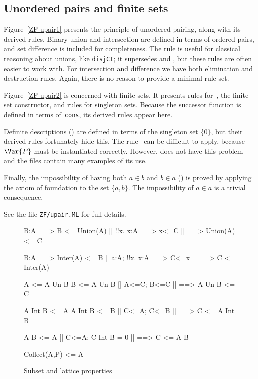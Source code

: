 \subsection{Unordered pairs and finite sets}
Figure~\ref{ZF-upair1} presents the principle of unordered pairing, along
with its derived rules.  Binary union and intersection are defined in terms
of ordered pairs, and set difference is included for completeness.  The
rule  is useful for classical reasoning about unions,
like {\tt disjCI}\@; it supersedes  and
, but these rules are often easier to work with.  For
intersection and difference we have both elimination and destruction rules.
Again, there is no reason to provide a minimal rule set.

Figure~\ref{ZF-upair2} is concerned with finite sets.  It presents rules
for~, the finite set constructor, and rules for singleton
sets.  Because the successor function is defined in terms of~{\tt cons},
its derived rules appear here.

Definite descriptions () are defined in terms of the singleton
set $\{0\}$, but their derived rules fortunately hide this.  The
rule~ can be difficult to apply, because $\Var{P}$ must be
instantiated correctly.  However,  does not have this
problem and the files contain many examples of its use.

Finally, the impossibility of having both $a\in b$ and $b\in a$
() is proved by applying the axiom of foundation to
the set $\{a,b\}$.  The impossibility of $a\in a$ is a trivial consequence.

See the file {\tt ZF/upair.ML} for full details.



\begin{figure}
\begin{ttbox}
       B:A ==> B <= Union(A)
       [| !!x. x:A ==> x<=C |] ==> Union(A) <= C

       B:A ==> Inter(A) <= B
    [| a:A;  !!x. x:A ==> C<=x |] ==> C <= Inter(A)

         A <= A Un B
         B <= A Un B
          [| A<=C;  B<=C |] ==> A Un B <= C

        A Int B <= A
        A Int B <= B
      [| C<=A;  C<=B |] ==> C <= A Int B

       A-B <= A
     [| C<=A;  C Int B = 0 |] ==> C <= A-B

    Collect(A,P) <= A
\end{ttbox}
\caption{Subset and lattice properties} \label{ZF-subset}
\end{figure}


